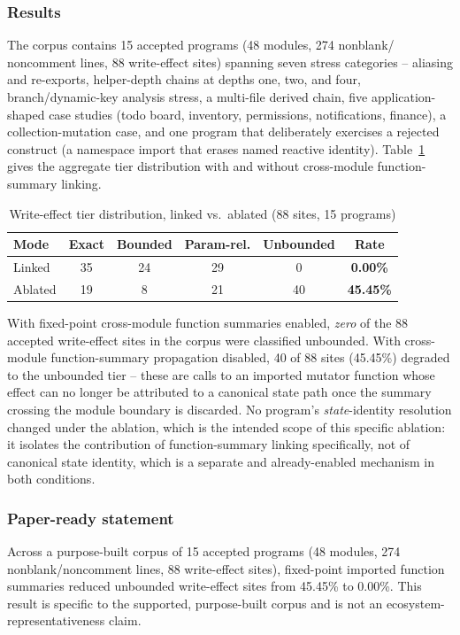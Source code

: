 \documentclass[conference]{IEEEtran}
\begin{document}
\subsubsection{Results}
The corpus contains 15 accepted programs (48 modules, 274 nonblank/
noncomment lines, 88 write-effect sites) spanning seven stress categories --
aliasing and re-exports, helper-depth chains at depths one, two, and four,
branch/dynamic-key analysis stress, a multi-file derived chain, five
application-shaped case studies (todo board, inventory, permissions,
notifications, finance), a collection-mutation case, and one program that
deliberately exercises a rejected construct (a namespace import that erases
named reactive identity). Table~\ref{tab:ablation} gives the aggregate tier
distribution with and without cross-module function-summary linking.

\begin{table}[h]
\centering
\caption{Write-effect tier distribution, linked vs.\ ablated (88 sites, 15 programs)}
\label{tab:ablation}
\footnotesize
\begin{tabular}{@{}lccccc@{}}
\toprule
\textbf{Mode} & Exact & Bounded & Param-rel. & Unbounded & \textbf{Rate} \\
\midrule
Linked & 35 & 24 & 29 & 0 & \textbf{0.00\%} \\
Ablated & 19 & 8 & 21 & 40 & \textbf{45.45\%} \\
\bottomrule
\end{tabular}
\end{table}

With fixed-point cross-module function summaries enabled, \emph{zero} of the
88 accepted write-effect sites in the corpus were classified unbounded.
With cross-module function-summary propagation disabled, 40 of 88 sites
(45.45\%) degraded to the unbounded tier -- these are calls to an imported
mutator function whose effect can no longer be attributed to a canonical
state path once the summary crossing the module boundary is discarded. No
program's \emph{state}-identity resolution changed under the ablation, which
is the intended scope of this specific ablation: it isolates the
contribution of function-summary linking specifically, not of canonical
state identity, which is a separate and already-enabled mechanism in both
conditions.

\subsubsection{Paper-ready statement}
Across a purpose-built corpus of 15 accepted programs (48 modules, 274
nonblank/noncomment lines, 88 write-effect sites), fixed-point imported
function summaries reduced unbounded write-effect sites from 45.45\% to
0.00\%. This result is specific to the supported, purpose-built corpus and
is not an ecosystem-representativeness claim.
\end{document}
